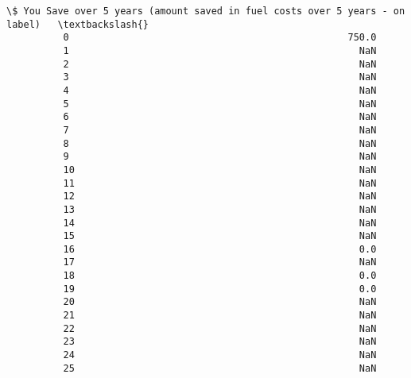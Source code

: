 \documentclass[11pt]{article}
\begin{document}
\begin{Verbatim}[commandchars=\\\{\}]
                \$ You Save over 5 years (amount saved in fuel costs over 5 years - on label)   \textbackslash{}
          0                                                 750.0                               
          1                                                   NaN                               
          2                                                   NaN                               
          3                                                   NaN                               
          4                                                   NaN                               
          5                                                   NaN                               
          6                                                   NaN                               
          7                                                   NaN                               
          8                                                   NaN                               
          9                                                   NaN                               
          10                                                  NaN                               
          11                                                  NaN                               
          12                                                  NaN                               
          13                                                  NaN                               
          14                                                  NaN                               
          15                                                  NaN                               
          16                                                  0.0                               
          17                                                  NaN                               
          18                                                  0.0                               
          19                                                  0.0                               
          20                                                  NaN                               
          21                                                  NaN                               
          22                                                  NaN                               
          23                                                  NaN                               
          24                                                  NaN                               
          25                                                  NaN                               

\end{Verbatim}
\end{document}

